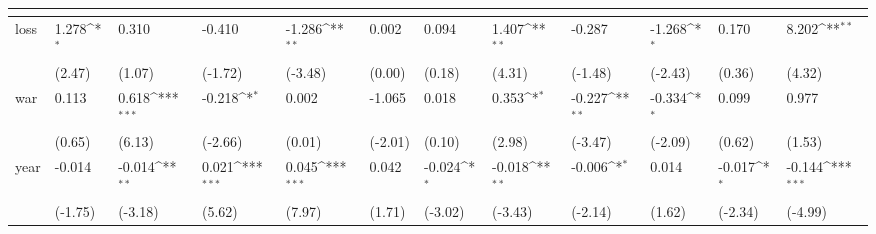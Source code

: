 \def\sym#1{\ifmmode^{#1}\else\(^{#1}\)\fi}
\begin{tabular}{p{1.5cm} p{2cm} p{1.7cm} p{1.7cm} p{1.7cm} p{1.7cm} p{1.7cm} p{1.7cm} p{1.7cm} p{1.7cm} p{1.7cm} p{1.7cm}}
                &&&&&&&&&&&\\
\hline
loss            &    1.278\sym{*}  &    0.310         &   -0.410         &   -1.286\sym{**} &    0.002         &    0.094         &    1.407\sym{**} &   -0.287         &   -1.268\sym{*}  &    0.170         &    8.202\sym{**} \\
                &   (2.47)         &   (1.07)         &  (-1.72)         &  (-3.48)         &   (0.00)         &   (0.18)         &   (4.31)         &  (-1.48)         &  (-2.43)         &   (0.36)         &   (4.32)         \\
war             &    0.113         &    0.618\sym{***}&   -0.218\sym{*}  &    0.002         &   -1.065         &    0.018         &    0.353\sym{*}  &   -0.227\sym{**} &   -0.334\sym{*}  &    0.099         &    0.977         \\
                &   (0.65)         &   (6.13)         &  (-2.66)         &   (0.01)         &  (-2.01)         &   (0.10)         &   (2.98)         &  (-3.47)         &  (-2.09)         &   (0.62)         &   (1.53)         \\
year            &   -0.014         &   -0.014\sym{**} &    0.021\sym{***}&    0.045\sym{***}&    0.042         &   -0.024\sym{*}  &   -0.018\sym{**} &   -0.006\sym{*}  &    0.014         &   -0.017\sym{*}  &   -0.144\sym{***}\\
                &  (-1.75)         &  (-3.18)         &   (5.62)         &   (7.97)         &   (1.71)         &  (-3.02)         &  (-3.43)         &  (-2.14)         &   (1.62)         &  (-2.34)         &  (-4.99)         \\
\end{tabular}
